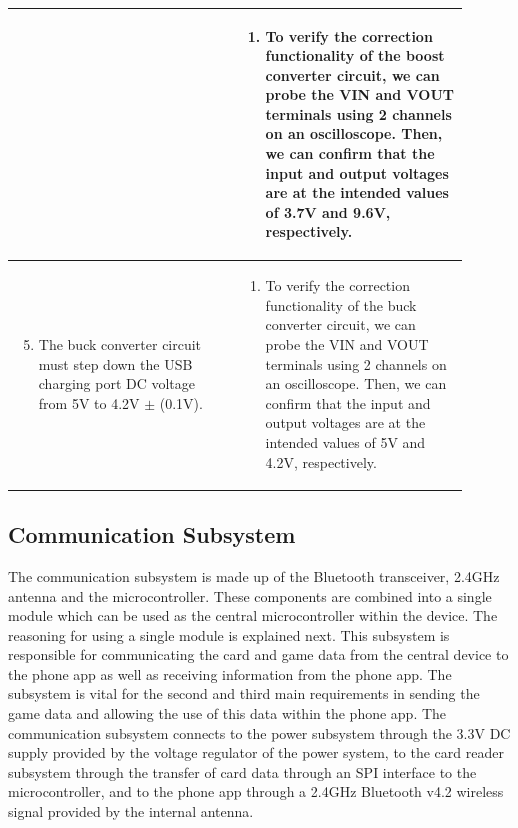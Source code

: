 \documentclass[12pt]{article}
\begin{document}
\begin{table}[!h]
{\begin{tabular}{| p{0.45\linewidth} | p{0.45\linewidth} |}
\begin{enumerate}
		\end{enumerate} & \begin{enumerate}[label=\alph*)]
 			\item To verify the correction functionality of the boost converter circuit, we can probe the VIN and VOUT terminals using 2 channels on an oscilloscope. Then, we can confirm that the input and output voltages are at the intended values of 3.7V and 9.6V, respectively.
		\end{enumerate} \\
		\hline
		\begin{enumerate}
		\setcounter{enumi}{4}
 			\item The buck converter circuit must step down the USB charging port DC voltage from 5V to 4.2V $\pm$ (0.1V).
		\end{enumerate} & \begin{enumerate}[label=\alph*)]
 			\item To verify the correction functionality of the buck converter circuit, we can probe the VIN and VOUT terminals using 2 channels on an oscilloscope. Then, we can confirm that the input and output voltages are at the intended values of 5V and 4.2V, respectively.
		\end{enumerate} \\
		\hline
	\end{tabular}
	}
\end{table}

\subsection{Communication Subsystem}

The communication subsystem is made up of the Bluetooth transceiver, 2.4GHz antenna and the microcontroller. These components are combined into a single module which can be used as the central microcontroller within the device. The reasoning for using a single module is explained next. This subsystem is responsible for communicating the card and game data from the central device to the phone app as well as receiving information from the phone app. The subsystem is vital for the second and third main requirements in sending the game data and allowing the use of this data within the phone app. The communication subsystem connects to the power subsystem through the 3.3V DC supply provided by the voltage regulator of the power system, to the card reader subsystem through the transfer of card data through an SPI interface to the microcontroller, and to the phone app through a 2.4GHz Bluetooth v4.2 wireless signal provided by the internal antenna.
\end{document}

